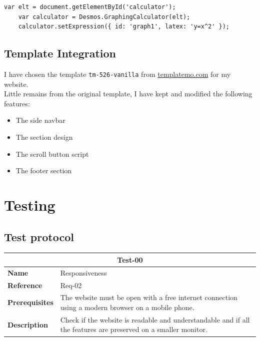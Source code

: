 \documentclass{article}
\begin{document}
\begin{lstlisting}[style=js]
    var elt = document.getElementById('calculator');
    var calculator = Desmos.GraphingCalculator(elt);
    calculator.setExpression({ id: 'graph1', latex: 'y=x^2' });
\end{lstlisting}

\subsection{Template Integration}

I have chosen the template \texttt{tm-526-vanilla} from \href{https://templatemo.com}{templatemo.com}\cite{templatemo} for my website. \\
Little remains from the original template, I have kept and modified the following features:

\begin{itemize}
    \item The side navbar
    \item The section design
    \item The scroll button script
    \item The footer section
\end{itemize}

\pagebreak

\section{Testing}

\subsection{Test protocol}

\bgroup{}
\def\arraystretch{1.25}
\begin{center}
    \begin{tabular}{ |l|p{9cm}| }
        \hline
        \multicolumn{2}{|c|}{\textbf{Test-00}} \\
        \hline
        \textbf{Name} & Responsiveness \\
        \hline
        \textbf{Reference} & Req-02 \\
        \hline
        \textbf{Prerequisites} & The website must be open with a free internet connection using a modern browser on a mobile phone. \\
        \hline
        \textbf{Description} & Check if the website is readable and understandable and if all the features are preserved on a smaller monitor. \\
        \hline
    \end{tabular}
\end{center}
\egroup{}
\end{document}
